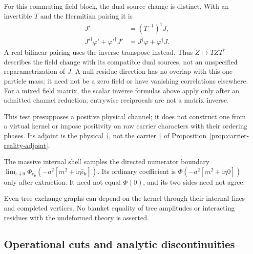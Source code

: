 \documentclass[final,5p,times,twocolumn,numbers,nopreprintline]{elsarticle}
\numberwithin{equation}{section}
\theoremstyle{definition}
\theoremstyle{remark}
\newcommand{\ii}{\mathrm i}
\newcommand{\bb}{\mathfrak b}
\newcommand{\Ph}{\Phi}
\newcommand{\ee}{e_{\bb}}
\newcommand{\epsvec}{\hat\epsilon_{\bb}}
\begin{document}
For this commuting field block, the dual source change is distinct.
With an invertible \(T\) and the Hermitian pairing it is
\begin{equation}
 \begin{aligned}
  J'&=(T^{-1})^\dagger J,\\
  J'^\dagger\varphi'+\varphi'^\dagger J'
    &=J^\dagger\varphi+\varphi^\dagger J.
 \end{aligned}
 \label{eq:physical-field-source-duality}
\end{equation}
A real bilinear pairing uses the inverse transpose instead. Thus
\(Z\mapsto TZT^\dagger\) describes the field change with its
compatible dual sources, not an unspecified reparametrization of \(J\).
A null residue direction has no overlap with this one-particle mass;
it need not be a zero field or have vanishing correlations elsewhere.
For a mixed field matrix, the scalar inverse formulas above apply only
after an admitted channel reduction; entrywise reciprocals are not a
matrix inverse.

This test presupposes a positive physical channel; it does not construct
one from a virtual kernel or impose positivity on raw carrier characters
with their ordering phases. Its adjoint is the physical \(\dagger\),
not the carrier \(\ddagger\) of
Proposition~\ref{prop:carrier-reality-adjoint}.

The massive internal shell samples the directed numerator boundary
\(\lim_{\varepsilon\downarrow0}
\Ph_{\ee}(-a^2[m^2+\ii\eta\epsvec])\).
Its ordinary coefficient is
\(\Ph(-a^2[m^2+\ii\eta0])\) only after extraction.
It need not equal \(\Ph(0)\), and its two sides need not agree.

Even tree exchange graphs can depend on the kernel through their
internal lines and completed vertices. No blanket equality of
tree amplitudes or interacting residues with the undeformed theory
is asserted.

\subsection{Operational cuts and analytic discontinuities}
\label{sec:cut-disc}
\end{document}
